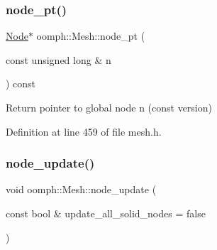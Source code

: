 \mbox{\label{classoomph_1_1Mesh_a468ab976a9df7c1eb5bade6405a96a72}} 
\subsubsection{\texorpdfstring{node\+\_\+pt()}{node\_pt()}\hspace{0.1cm}{\footnotesize\ttfamily [2/2]}}
{\footnotesize\ttfamily \hyperlink{classoomph_1_1Node}{Node}$\ast$ oomph\+::\+Mesh\+::node\+\_\+pt (\begin{DoxyParamCaption}\item[{const unsigned long \&}]{n }\end{DoxyParamCaption}) const\hspace{0.3cm}{\ttfamily [inline]}}



Return pointer to global node n (const version) 



Definition at line 459 of file mesh.\+h.

\mbox{\label{classoomph_1_1Mesh_a95bf112e5e1b3892e70a41f91b3cc523}} 
\subsubsection{\texorpdfstring{node\+\_\+update()}{node\_update()}}
{\footnotesize\ttfamily void oomph\+::\+Mesh\+::node\+\_\+update (\begin{DoxyParamCaption}\item[{const bool \&}]{update\+\_\+all\+\_\+solid\+\_\+nodes = {\ttfamily false} }\end{DoxyParamCaption})\hspace{0.3cm}{\ttfamily [virtual]}}



